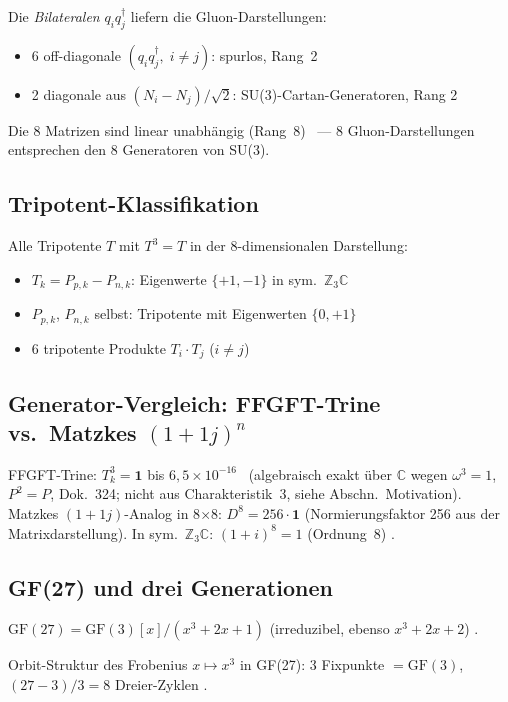 Die \emph{Bilateralen} $q_i q_j^\dagger$ liefern die Gluon-Darstellungen:
\begin{itemize}
  \item 6 off-diagonale $(q_i q_j^\dagger,\; i\neq j)$: spurlos, Rang~2 \BM
  \item 2 diagonale aus $(N_i-N_j)/\sqrt{2}$: SU(3)-Cartan-Generatoren, Rang 2 \BM
\end{itemize}
Die 8 Matrizen sind linear unabhängig (Rang~8) \BM\ — 8 Gluon-Darstellungen
entsprechen den 8 Generatoren von SU(3).

\subsection{Tripotent-Klassifikation}

Alle Tripotente $T$ mit $T^3 = T$ in der 8-dimensionalen Darstellung:
\begin{itemize}
  \item $T_k = P_{p,k} - P_{n,k}$: Eigenwerte $\{+1,-1\}$ in sym.\
    $\mathbb{Z}_3\mathbb{C}$ \BM
  \item $P_{p,k}$, $P_{n,k}$ selbst: Tripotente mit Eigenwerten $\{0,+1\}$ \BM
  \item 6 tripotente Produkte $T_i \cdot T_j$ ($i\neq j$) \BM
\end{itemize}

\subsection{Generator-Vergleich: FFGFT-Trine vs.\ Matzkes $(1+1j)^n$}

FFGFT-Trine: $T_k^3 = \mathbf{1}$ bis $6{,}5\times10^{-16}$ \BM\ (algebraisch
exakt über $\mathbb{C}$ wegen $\omega^3 = 1$, $P^2 = P$, Dok.~324; nicht aus
Charakteristik~3, siehe Abschn.~\glqq Motivation\grqq{}).
Matzkes $(1+1j)$-Analog in 8$\times$8: $D^8 = 256\cdot\mathbf{1}$
(Normierungsfaktor 256 aus der Matrixdarstellung).
In sym.\ $\mathbb{Z}_3\mathbb{C}$: $(1+i)^8 = 1$ (Ordnung~8) \BM.

\subsection{GF(27) und drei Generationen}

$\mathrm{GF}(27) = \mathrm{GF}(3)[x]/(x^3+2x+1)$ (irreduzibel, ebenso
$x^3+2x+2$) \BM.

Orbit-Struktur des Frobenius $x\mapsto x^3$ in GF(27):
3 Fixpunkte $= \mathrm{GF}(3)$,
$(27-3)/3 = 8$ Dreier-Zyklen \BM.

